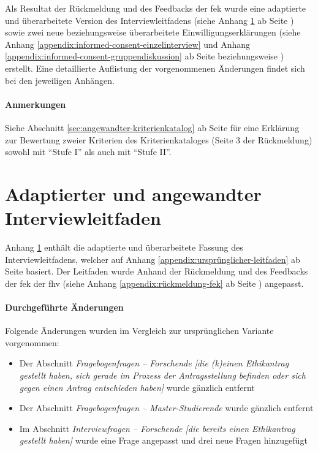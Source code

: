 \documentclass[a4paper,12pt,twoside]{scrreprt}
\begin{document}
\medskip

Als Resultat der Rückmeldung und des Feedbacks der \ac{fek} wurde eine adaptierte und überarbeitete Version des Interviewleitfadens (siehe Anhang \ref{appendix:interview-leitfaden} ab Seite \pageref{appendix:interview-leitfaden}) sowie zwei neue beziehungsweise überarbeitete Einwilligungserklärungen (siehe Anhang \ref{appendix:informed-consent-einzelinterview} und Anhang \ref{appendix:informed-consent-gruppendiskussion} ab Seite \pageref{appendix:informed-consent-einzelinterview} beziehungsweise \pageref{appendix:informed-consent-gruppendiskussion}) erstellt. Eine detaillierte Auflistung der vorgenommenen Änderungen findet sich bei den jeweiligen Anhängen.

\subsubsection*{Anmerkungen}
\label{appendix:anmerkungen-rückmeldung-fek}

Siehe Abschnitt \ref{sec:angewandter-kriterienkatalog} ab Seite \pageref{sec:angewandter-kriterienkatalog} für eine Erklärung zur Bewertung zweier Kriterien des Kriterienkataloges (Seite 3 der Rückmeldung) sowohl mit \enquote{Stufe I} als auch mit \enquote{Stufe II}.



\cleardoublepage
\chapter{Adaptierter und angewandter Interviewleitfaden}
\label{appendix:interview-leitfaden}

Anhang \ref{appendix:interview-leitfaden} enthält die adaptierte und überarbeitete Fassung des Interviewleitfadens, welcher auf Anhang \ref{appendix:ursprünglicher-leitfaden} ab Seite \pageref{appendix:ursprünglicher-leitfaden} basiert. Der Leitfaden wurde Anhand der Rückmeldung und des Feedbacks der \acl{fek} der \acl{fhv} (siehe Anhang \ref{appendix:rückmeldung-fek} ab Seite \pageref{appendix:rückmeldung-fek}) angepasst.

\subsubsection*{Durchgeführte Änderungen}
\label{appendix:änderungen-interview-leitfaden}

Folgende Änderungen wurden im Vergleich zur ursprünglichen Variante vorgenommen:
\begin{itemize}
    \item Der Abschnitt \textit{Fragebogenfragen -- Forschende [die (k)einen Ethikantrag gestellt haben, sich gerade im Prozess der Antragsstellung befinden oder sich gegen einen Antrag entschieden haben]} wurde gänzlich entfernt
    \item Der Abschnitt \textit{Fragebogenfragen -- Master-Studierende} wurde gänzlich entfernt
    \item Im Abschnitt \textit{Interviewfragen -- Forschende [die bereits einen Ethikantrag gestellt haben]} wurde eine Frage angepasst und drei neue Fragen hinzugefügt
\end{itemize}
\end{document}
